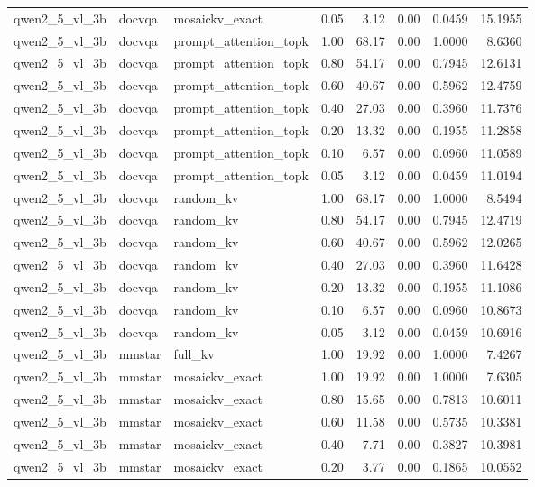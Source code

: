 \begin{longtable}{lllrrrrr}
qwen2\_5\_vl\_3b & docvqa & mosaickv\_exact & 0.05 & 3.12 & 0.00 & 0.0459 & 15.1955 \\
qwen2\_5\_vl\_3b & docvqa & prompt\_attention\_topk & 1.00 & 68.17 & 0.00 & 1.0000 & 8.6360 \\
qwen2\_5\_vl\_3b & docvqa & prompt\_attention\_topk & 0.80 & 54.17 & 0.00 & 0.7945 & 12.6131 \\
qwen2\_5\_vl\_3b & docvqa & prompt\_attention\_topk & 0.60 & 40.67 & 0.00 & 0.5962 & 12.4759 \\
qwen2\_5\_vl\_3b & docvqa & prompt\_attention\_topk & 0.40 & 27.03 & 0.00 & 0.3960 & 11.7376 \\
qwen2\_5\_vl\_3b & docvqa & prompt\_attention\_topk & 0.20 & 13.32 & 0.00 & 0.1955 & 11.2858 \\
qwen2\_5\_vl\_3b & docvqa & prompt\_attention\_topk & 0.10 & 6.57 & 0.00 & 0.0960 & 11.0589 \\
qwen2\_5\_vl\_3b & docvqa & prompt\_attention\_topk & 0.05 & 3.12 & 0.00 & 0.0459 & 11.0194 \\
qwen2\_5\_vl\_3b & docvqa & random\_kv & 1.00 & 68.17 & 0.00 & 1.0000 & 8.5494 \\
qwen2\_5\_vl\_3b & docvqa & random\_kv & 0.80 & 54.17 & 0.00 & 0.7945 & 12.4719 \\
qwen2\_5\_vl\_3b & docvqa & random\_kv & 0.60 & 40.67 & 0.00 & 0.5962 & 12.0265 \\
qwen2\_5\_vl\_3b & docvqa & random\_kv & 0.40 & 27.03 & 0.00 & 0.3960 & 11.6428 \\
qwen2\_5\_vl\_3b & docvqa & random\_kv & 0.20 & 13.32 & 0.00 & 0.1955 & 11.1086 \\
qwen2\_5\_vl\_3b & docvqa & random\_kv & 0.10 & 6.57 & 0.00 & 0.0960 & 10.8673 \\
qwen2\_5\_vl\_3b & docvqa & random\_kv & 0.05 & 3.12 & 0.00 & 0.0459 & 10.6916 \\
qwen2\_5\_vl\_3b & mmstar & full\_kv & 1.00 & 19.92 & 0.00 & 1.0000 & 7.4267 \\
qwen2\_5\_vl\_3b & mmstar & mosaickv\_exact & 1.00 & 19.92 & 0.00 & 1.0000 & 7.6305 \\
qwen2\_5\_vl\_3b & mmstar & mosaickv\_exact & 0.80 & 15.65 & 0.00 & 0.7813 & 10.6011 \\
qwen2\_5\_vl\_3b & mmstar & mosaickv\_exact & 0.60 & 11.58 & 0.00 & 0.5735 & 10.3381 \\
qwen2\_5\_vl\_3b & mmstar & mosaickv\_exact & 0.40 & 7.71 & 0.00 & 0.3827 & 10.3981 \\
qwen2\_5\_vl\_3b & mmstar & mosaickv\_exact & 0.20 & 3.77 & 0.00 & 0.1865 & 10.0552 \\

\end{longtable}
